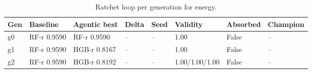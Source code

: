 \begin{table}[H]
\centering\small
\caption{Ratchet loop per generation for energy.}
\label{tab:ratchet-generations-ratchet-ledger-energy}
\begin{tabular}{llllllll}
\toprule
Gen & Baseline & Agentic best & Delta & Seed & Validity & Absorbed & Champion \\
\midrule
g0 & RF-r 0.9590 & RF-r 0.9590 & -- & -- & 1.00 & False & -- \\
g1 & RF-r 0.9590 & HGB-r 0.8167 & -- & -- & 1.00 & False & -- \\
g2 & RF-r 0.9590 & HGB-r 0.8192 & -- & -- & 1.00/1.00/1.00 & False & -- \\
\bottomrule
\end{tabular}
\end{table}
